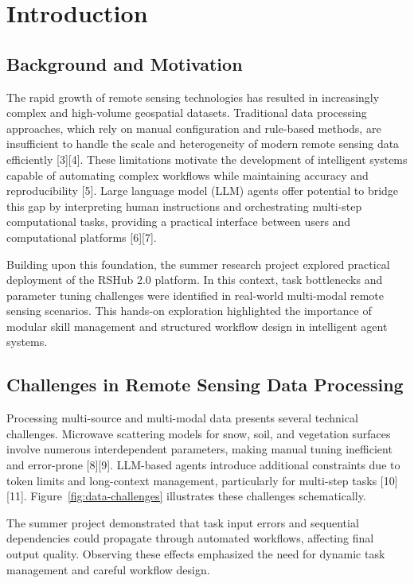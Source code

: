\chapter{Introduction}

{\fontsize{12pt}{14pt}\selectfont
	
	\section{Background and Motivation}
	The rapid growth of remote sensing technologies has resulted in increasingly complex and high-volume geospatial datasets. Traditional data processing approaches, which rely on manual configuration and rule-based methods, are insufficient to handle the scale and heterogeneity of modern remote sensing data efficiently [3][4]. These limitations motivate the development of intelligent systems capable of automating complex workflows while maintaining accuracy and reproducibility [5]. Large language model (LLM) agents offer potential to bridge this gap by interpreting human instructions and orchestrating multi-step computational tasks, providing a practical interface between users and computational platforms [6][7].
	
	Building upon this foundation, the summer research project explored practical deployment of the RSHub 2.0 platform. In this context, task bottlenecks and parameter tuning challenges were identified in real-world multi-modal remote sensing scenarios. This hands-on exploration highlighted the importance of modular skill management and structured workflow design in intelligent agent systems.
	
	\section{Challenges in Remote Sensing Data Processing}
	Processing multi-source and multi-modal data presents several technical challenges. Microwave scattering models for snow, soil, and vegetation surfaces involve numerous interdependent parameters, making manual tuning inefficient and error-prone [8][9]. LLM-based agents introduce additional constraints due to token limits and long-context management, particularly for multi-step tasks [10][11]. Figure~\ref{fig:data-challenges} illustrates these challenges schematically.
	
	The summer project demonstrated that task input errors and sequential dependencies could propagate through automated workflows, affecting final output quality. Observing these effects emphasized the need for dynamic task management and careful workflow design.
	
}
